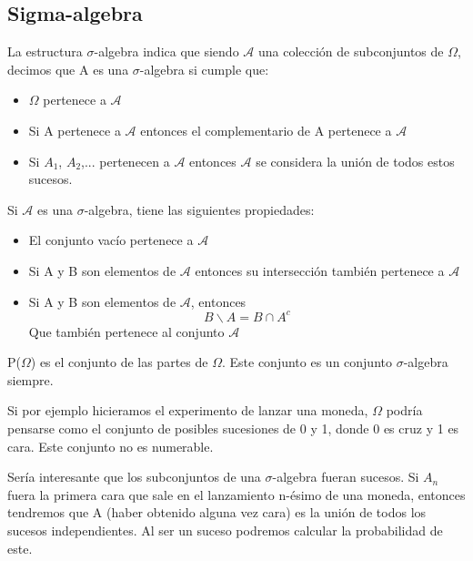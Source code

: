 \documentclass[11pt]{article}
\theoremstyle{plain}
\begin{document}
        \subsection{Sigma-algebra} %
        \label{sub:Sigma_algebra}
            La estructura $\sigma$-algebra indica que siendo $\mathcal{A}$ una colección de subconjuntos de $\varOmega$, decimos que A es una $\sigma$-algebra si cumple que: 
            \begin{itemize}
                \item $\varOmega$ pertenece a $\mathcal{A}$
                \item Si A pertenece a $\mathcal{A}$ entonces el complementario de A pertenece a $\mathcal{A}$
                \item Si $A_{1}$, $A_{2}$,... pertenecen a $\mathcal{A}$ entonces $\mathcal{A}$ se considera la unión de todos estos sucesos.
            \end{itemize}

            Si $\mathcal{A}$ es una $\sigma$-algebra, tiene las siguientes propiedades:
            \begin{itemize}
                \item El conjunto vacío pertenece a $\mathcal{A}$
                \item Si A y B son elementos de $\mathcal{A}$ entonces su intersección también pertenece a $\mathcal{A}$
                \item Si A y B son elementos de $\mathcal{A}$, entonces 
                    \begin{equation}
                        B \backslash A = B \cap A^{c}
                    \end{equation}
                    Que también pertenece al conjunto $\mathcal{A}$
            \end{itemize}
            
            P($\varOmega$) es el conjunto de las partes de $\varOmega$. Este conjunto es un conjunto $\sigma$-algebra siempre. 

            Si por ejemplo hicieramos el experimento de lanzar una moneda, $\varOmega$ podría pensarse como el conjunto de posibles sucesiones de 0 y 1, donde 0 es cruz y 1 es cara. Este conjunto no es numerable.

            Sería interesante que los subconjuntos de una $\sigma$-algebra fueran sucesos. Si $A_{n}$ fuera la primera cara que sale en el lanzamiento n-ésimo de una moneda, entonces tendremos que A (haber obtenido alguna vez cara) es la unión de todos los sucesos independientes. Al ser un suceso podremos calcular la probabilidad de este. 
\end{document}
